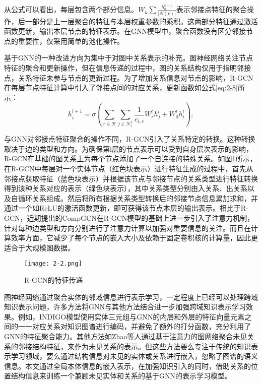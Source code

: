 从公式可以看出，每层包含两个部分信息。\(W_{k}\sum\frac{h^{k-1}_{u}}{|N(v)|}\)表示邻接点特征的聚合操作，后一部分是上一层聚合的特征与本层权重参数的乘积。这两部分特征通过激活函数更新，输出本层节点的特征表示。在GNN模型中，聚合函数没有区分邻接节点的重要性，仅采用简单的池化操作。

基于GNN的一种改进方向为集中于对图中关系表示的补充。图神经网络关注节点特征的聚合和更新操作，但在信息传递的过程中，图的关系结构仅用于指明邻接点，关系特征未参与节点的更新过程。为了增加关系信息对节点的影响，R-GCN在每层节点特征计算中引入了邻接点间的对应关系，更新函数如公式\ref{eq:2-8}所示：
\begin{equation}
  h_{i}^{l+1} = \sigma \left( \sum_{r\in\mathcal{R}} \sum_{j\in\mathcal{N}_{i}^{r}} \frac{1}{c_{i,r}}W_{r}^{l}h_{j}^{l} + W_{0}^{l}h_{i}^{l}\right), \label{eq:2-8}
\end{equation}

与GNN对邻接点特征聚合的操作不同，R-GCN引入了关系特定的转换。这种转换取决于边的类型和方向。为确保第l层的节点表示可以受到自身层次表示的影响，R-GCN在基础的图关系上为每个节点添加了一个自连接的特殊关系。如图\ref{fig:2-2}所示，在R-GCN中每层对一个实体节点（红色块表示）进行特征生成的过程中，首先从邻接点获取特征（蓝色块表示）并根据该节点与邻接节点的关系类型进行特征转换得到该种关系对应的表示（绿色块表示），其中关系类型分别由入关系、出关系以及自循环关系组成。然后将所有根据关系类型转换后的邻接节点信息累加求和，并通过一个如ReLU的激活函数更新，即可获得该节点本层的输出表示。相比于R-GCN，近期提出的CompGCN在R-GCN模型的基础上进一步引入了注意力机制，针对每种边类型和方向分别进行了注意力计算以加强对重要信息的关注。而且在计算效率方面，它减少了每个节点的嵌入大小及依赖于固定卷积核的计算量，因此更适合于大规模图数据。
\begin{figure}[h]
  \centering
  \texttt{[image: 2-2.png]}
  \caption{R-GCN的特征传递}
  \label{fig:2-2}
\end{figure}

图神经网络通过聚合实体的邻域信息进行表示学习，一定程度上已经可以处理跨域知识表示问题，许多方法将GNN与其他方法结合进一步加强跨域知识表示学习效果。例如，INDIGO\cite{liu2021indigo}模型使用实体三元组与GNN的内层和外层的特征向量元素之间的一一对应关系对知识图谱进行编码，并避免了额外的打分函数，充分利用了GNN的特征聚合能力。其他方法如Zhao\cite{zhao2020attention}等人通过基于注意力的图网络聚合未见关系的邻接结构特征，来作为未见关系的表示。但这些方法要么专注于传统的知识表示学习领域，要么通过结构信息对未见的实体或关系进行嵌入，忽略了图谱的语义信息。本文通过全局本体信息的嵌入表示，在加强知识引入的同时，借助关系的位置结构信息来训练一个兼顾未见实体和关系的基于GNN的表示学习模型。

